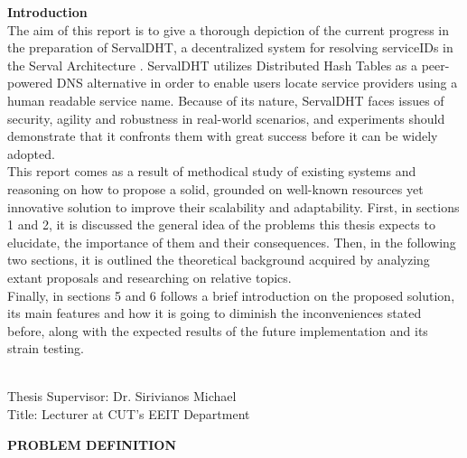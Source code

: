 \documentclass[12pt,a4paper,oneside]{article}
\begin{document}
{}
{\Large \bf \noindent Introduction} \\[0.5cm]
The aim of this report is to give a thorough depiction of the current progress in the preparation of ServalDHT, a decentralized system for resolving serviceIDs in the Serval Architecture \cite{Nordstrom2012}.
ServalDHT utilizes Distributed Hash Tables  as a peer-powered DNS   alternative in order to enable users locate service providers using a human readable service name.
Because of its nature, ServalDHT faces issues of security, agility and robustness in real-world scenarios, and experiments should demonstrate that it confronts them with great success before it can be widely adopted.\\
\indent This report comes as a result of methodical study of existing systems and reasoning on how to propose a solid, grounded on well-known resources yet innovative solution to improve their scalability and adaptability.
First, in sections 1 and 2, it is discussed the general idea of the problems this thesis expects to elucidate, the importance of them and their consequences.
Then, in the following two sections, it is outlined the theoretical background acquired by analyzing extant proposals and researching on relative topics.\\
\indent Finally, in sections 5 and 6 follows a brief introduction on the proposed solution, its main features and how it is going to diminish the inconveniences stated before, along with the expected results of the future implementation and its strain testing.

~\\[0.5cm]
{\large
\noindent Thesis Supervisor: Dr. Sirivianos Michael\\
\noindent Title: Lecturer at CUT's EEIT Department}

\newpage
\thispagestyle{empty}
{}
{\Huge \bf \noindent PROBLEM DEFINITION}
\newpage


\newpage
\end{document}
